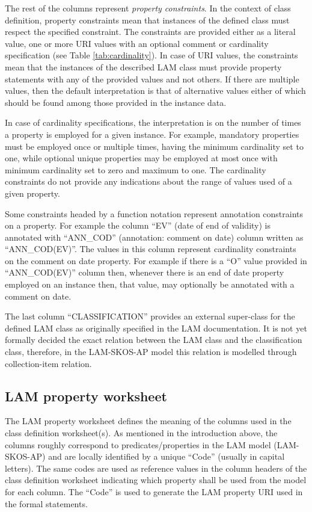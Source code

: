 The rest of the columns represent \emph{property constraints}. In the
context of class definition, property constraints mean that instances of
the defined class must respect the specified constraint. The constraints
are provided either as a literal value, one or more URI values with an optional comment or cardinality specification (see Table \ref{tab:cardinality}). In case of URI values, the constraints mean that the instances of the described LAM class must provide property statements with any of the provided values and not others. If there are multiple values, then the default interpretation is that of alternative values either of which should be found among those provided in the instance data.

In case of cardinality specifications, the interpretation is on the number of times a property is employed for a given instance. For example, mandatory properties must be employed once or multiple times, having the minimum cardinality set to one, while optional unique properties may be employed at most once with minimum cardinality set to zero and maximum to one. The cardinality constraints do not provide any indications about the range of values used of a given property.

Some constraints headed by a function notation represent annotation
constraints on a property. For example the column ``EV'' (date of end of
validity) is annotated with ``ANN\_COD'' (annotation: comment on date)
column written as ``ANN\_COD(EV)''.  The values in this column represent
cardinality constraints on the comment on date property. For example if
there is a ``O'' value provided in ``ANN\_COD(EV)'' column then, whenever
there is an end of date property employed on an instance then, that
value, may optionally be annotated with a comment on date.

The last column ``CLASSIFICATION'' provides an external super-class for the defined LAM class as originally specified in the LAM documentation. It is not yet formally decided the exact relation between the LAM class and the classification class, therefore, in the LAM-SKOS-AP model this relation is modelled through collection-item relation.

\subsection{LAM property worksheet}

The LAM property worksheet defines the meaning of the columns
used in the class definition worksheet(s). As mentioned in the
introduction above, the columns roughly correspond to
predicates/properties in the LAM model (LAM-SKOS-AP) and are locally identified by a unique ``Code'' (usually in capital letters). The same codes are used as reference values in the column headers of the class definition worksheet indicating which property shall be used from the model for each column. The ``Code'' is used to generate the LAM property URI used in the formal statements.

